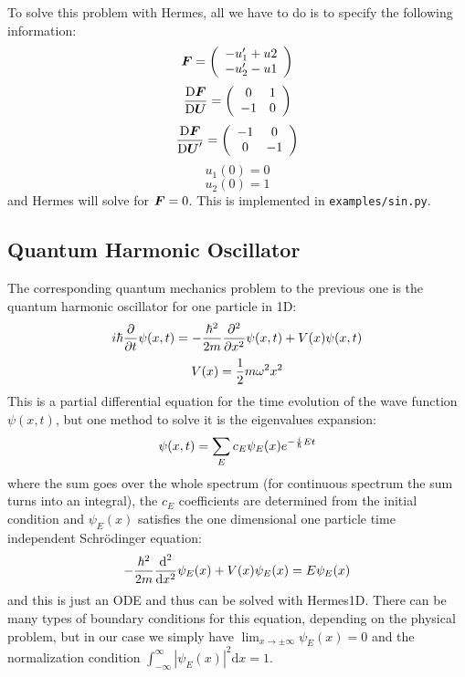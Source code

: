 \documentclass[12pt]{article}
\newcommand{\bfF}{\mbox{\boldmath $F$}}
\newcommand{\bfU}{\mbox{\boldmath $U$}}
\def\d{\mbox{d}}
\begin{document}
To solve this problem with Hermes, all we have to do is to specify the
following information:
$${\bfF} =
\left( \begin{array}{c}
-u_1'+u2 \\
-u_2'-u1 \\
\end{array} \right)
$$
$$
{{\rm D}\bfF\over{\rm D}\bfU}=
\left( \begin{array}{cc}
0 & 1 \\
-1 & 0 \\
\end{array} \right)
$$
$$
{{\rm D}\bfF\over{\rm D}\bfU'}=
\left( \begin{array}{cc}
-1 & 0 \\
0 & -1 \\
\end{array} \right)
$$
$$u_1(0)=0$$
$$u_2(0)=1$$
and Hermes will solve for $\bfF=0$. This is implemented in
\texttt{examples/sin.py}.

\subsection{Quantum Harmonic Oscillator}

The corresponding quantum mechanics problem to the previous one is the quantum
harmonic oscillator for one particle in 1D:
$$
i\hbar{\partial\over\partial t}\psi(x, t)=
-{\hbar^2\over2m}{\partial^2\over\partial x^2}\psi(x,t)+V(x)\psi(x,t)
$$
$$
V(x)={1\over2}m\omega^2x^2
$$
This is a partial differential equation for the time evolution of the wave
function $\psi(x, t)$, but one method to solve it is the
eigenvalues expansion:
$$\psi(x,t) = \sum_E c_E\psi_E(x)e^{-{i\over\hbar}Et}$$
where the sum goes over the whole spectrum (for continuous spectrum the sum
turns into an integral), the $c_E$ coefficients are determined from the initial condition
and $\psi_E(x)$ satisfies the one dimensional one particle time independent
Schr\"odinger equation:
$$
-{\hbar^2\over2m}{\d^2\over\d x^2}\psi_E(x)+V(x)\psi_E(x)=E\psi_E(x)
$$
and this is just an ODE and thus can be solved with Hermes1D. There can be many
types of boundary conditions for this equation, depending on the physical
problem, but in our case we simply have $\lim_{x\to\pm\infty}\psi_E(x)=0$ and
the normalization condition $\int_{-\infty}^\infty|\psi_E(x)|^2\d x=1$.
\end{document}
